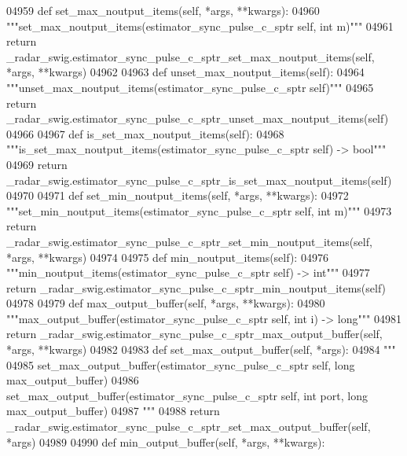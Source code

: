 \begin{DoxyCode}
{{{{{{{{{{{{{{{{{04959     \textcolor{keyword}{def }set_max_noutput_items(self, *args, **kwargs):
04960         \textcolor{stringliteral}{"""set\_max\_noutput\_items(estimator\_sync\_pulse\_c\_sptr self, int m)"""}
04961         \textcolor{keywordflow}{return} \_radar\_swig.estimator\_sync\_pulse\_c\_sptr\_set\_max\_noutput\_items(self, *args, **kwargs)
04962 
04963     \textcolor{keyword}{def }unset_max_noutput_items(self):
04964         \textcolor{stringliteral}{"""unset\_max\_noutput\_items(estimator\_sync\_pulse\_c\_sptr self)"""}
04965         \textcolor{keywordflow}{return} \_radar\_swig.estimator\_sync\_pulse\_c\_sptr\_unset\_max\_noutput\_items(self)
04966 
04967     \textcolor{keyword}{def }is_set_max_noutput_items(self):
04968         \textcolor{stringliteral}{"""is\_set\_max\_noutput\_items(estimator\_sync\_pulse\_c\_sptr self) -> bool"""}
04969         \textcolor{keywordflow}{return} \_radar\_swig.estimator\_sync\_pulse\_c\_sptr\_is\_set\_max\_noutput\_items(self)
04970 
04971     \textcolor{keyword}{def }set_min_noutput_items(self, *args, **kwargs):
04972         \textcolor{stringliteral}{"""set\_min\_noutput\_items(estimator\_sync\_pulse\_c\_sptr self, int m)"""}
04973         \textcolor{keywordflow}{return} \_radar\_swig.estimator\_sync\_pulse\_c\_sptr\_set\_min\_noutput\_items(self, *args, **kwargs)
04974 
04975     \textcolor{keyword}{def }min_noutput_items(self):
04976         \textcolor{stringliteral}{"""min\_noutput\_items(estimator\_sync\_pulse\_c\_sptr self) -> int"""}
04977         \textcolor{keywordflow}{return} \_radar\_swig.estimator\_sync\_pulse\_c\_sptr\_min\_noutput\_items(self)
04978 
04979     \textcolor{keyword}{def }max_output_buffer(self, *args, **kwargs):
04980         \textcolor{stringliteral}{"""max\_output\_buffer(estimator\_sync\_pulse\_c\_sptr self, int i) -> long"""}
04981         \textcolor{keywordflow}{return} \_radar\_swig.estimator\_sync\_pulse\_c\_sptr\_max\_output\_buffer(self, *args, **kwargs)
04982 
04983     \textcolor{keyword}{def }set_max_output_buffer(self, *args):
04984         \textcolor{stringliteral}{"""}
04985 \textcolor{stringliteral}{        set\_max\_output\_buffer(estimator\_sync\_pulse\_c\_sptr self, long max\_output\_buffer)}
04986 \textcolor{stringliteral}{        set\_max\_output\_buffer(estimator\_sync\_pulse\_c\_sptr self, int port, long max\_output\_buffer)}
04987 \textcolor{stringliteral}{        """}
04988         \textcolor{keywordflow}{return} \_radar\_swig.estimator\_sync\_pulse\_c\_sptr\_set\_max\_output\_buffer(self, *args)
04989 
04990     \textcolor{keyword}{def }min_output_buffer(self, *args, **kwargs):
}}}}}}}}}}}}}}}}}
\end{DoxyCode}
